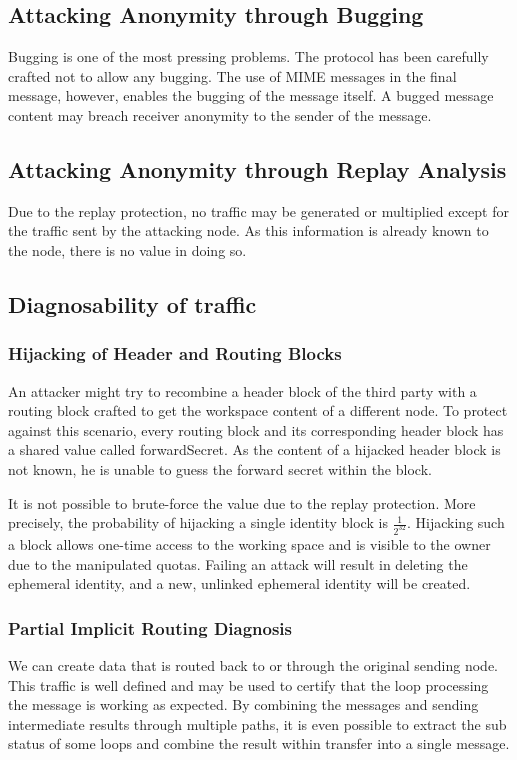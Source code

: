 \subsection{Attacking Anonymity through Bugging}
Bugging is one of the most pressing problems. The protocol has been carefully crafted not to allow any bugging. The use of MIME messages in the final message, however, enables the bugging of the message itself. A bugged message content may breach receiver anonymity to the sender of the message.

\subsection{Attacking Anonymity through Replay Analysis}
Due to the replay protection, no traffic may be generated or multiplied except for the traffic sent by the attacking node. As this information is already known to the node, there is no value in doing so. 

\subsection{Diagnosability of traffic}

\subsubsection{Hijacking of Header and Routing Blocks}
An attacker might try to recombine a header block of the third party with a routing block crafted to get the workspace content of a different node. To protect against this scenario, every routing block and its corresponding header block has a shared value called forwardSecret. As the content of a hijacked header block is not known, he is unable to guess the forward secret within the block.

It is not possible to brute-force the value due to the replay protection. More precisely, the probability of hijacking a single identity block is $\frac{1}{2^{32}}$. Hijacking such a block allows one-time access to the working space and is visible to the owner due to the manipulated quotas. Failing an attack will result in deleting the ephemeral identity, and a new, unlinked ephemeral identity will be created. 

\subsubsection{Partial Implicit Routing Diagnosis}
We can create data that is routed back to or through the original sending node. This traffic is well defined and may be used to certify that the loop processing the message is working as expected. By combining the messages and sending intermediate results through multiple paths, it is even possible to extract the sub status of some loops and combine the result within transfer into a single message.

